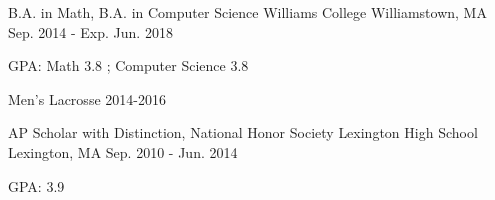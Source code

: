 

\begin{cventries}

  \cventry
    {B.A. in Math, B.A. in Computer Science} %
    {Williams College} %
    {Williamstown, MA} %
    {Sep. 2014 - Exp. Jun. 2018} %
    {
      \begin{cvitems} %
        \item {GPA: Math 3.8 ; Computer Science 3.8}
        \item {Men's Lacrosse 2014-2016}
      \end{cvitems}
    }



  \cventry
    {AP Scholar with Distinction, National Honor Society} %
    {Lexington High School} %
    {Lexington, MA} %
    {Sep. 2010 - Jun. 2014} %
    {
      \begin{cvitems} %
        \item {GPA: 3.9}
      \end{cvitems}
    }

\end{cventries}
